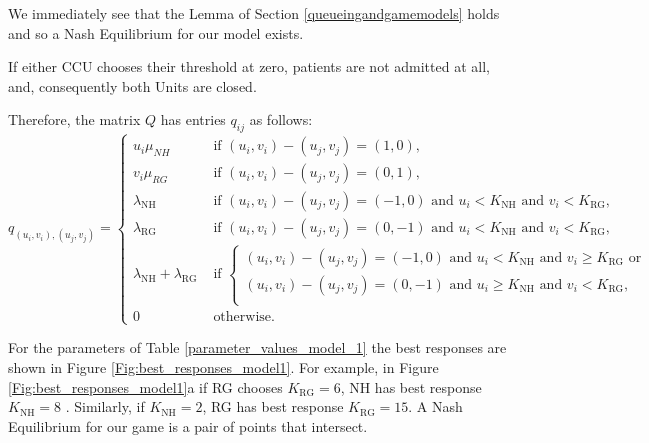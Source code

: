 \documentclass{article}
\newcommand{\NH}{\text{NH}}
\newcommand{\RG}{\text{RG}}
\begin{document}
We immediately see that the Lemma of Section \ref{queueingandgamemodels} holds and so a Nash Equilibrium for our model exists.

If either CCU chooses their threshold at zero, patients are not admitted at all, and, consequently both Units are closed.

Therefore, the matrix $Q$ has entries $q_{ij}$ as follows:
\begin{equation}
q_{(u_i,v_i),(u_j,v_j)}=\begin{cases} u_i\mu_{NH} & \text{ if  } (u_i,v_i)-(u_j,v_j)=(1,0),\\
 v_i\mu_{RG} & \text{ if  } (u_i,v_i)-(u_j,v_j)=(0,1),\\
 \lambda_{\NH} & \text{ if  } (u_i,v_i)-(u_j,v_j)=(-1,0)\text{ and } u_i<K_{\NH} \text{ and } v_i<K_{\RG},\\
 \lambda_{\RG} & \text{ if  } (u_i,v_i)-(u_j,v_j)=(0,-1) \text{ and } u_i<K_{\NH} \text{ and } v_i < K_{\RG},\\
\lambda_{\NH}+\lambda_{\RG} & \text{ if  } \left\{\begin{array}{l} (u_i,v_i)-(u_j,v_j)=(-1,0) \text{ and } u_i<K_{\NH} \text{ and } v_i \geq K_{\RG} \text{ or}\\ (u_i,v_i)-(u_j,v_j)=(0,-1) \text{ and } u_i \geq K_{\NH} \text{ and } v_i < K_{\RG},\\\end{array}\right.\\
0 & \text{ otherwise}.
\end{cases}
\end{equation}

For the parameters of Table \ref{parameter_values_model_1} the best responses are shown in Figure \ref{Fig:best_responses_model1}.
For example, in Figure \ref{Fig:best_responses_model1}a if RG chooses $K_{\RG}=6$, NH has best response $K_{\NH}=8$ .
Similarly, if $K_{\NH}=2$, RG has best response $K_{\RG}=15$.
A Nash Equilibrium for our game is a pair of points that intersect.
\end{document}
